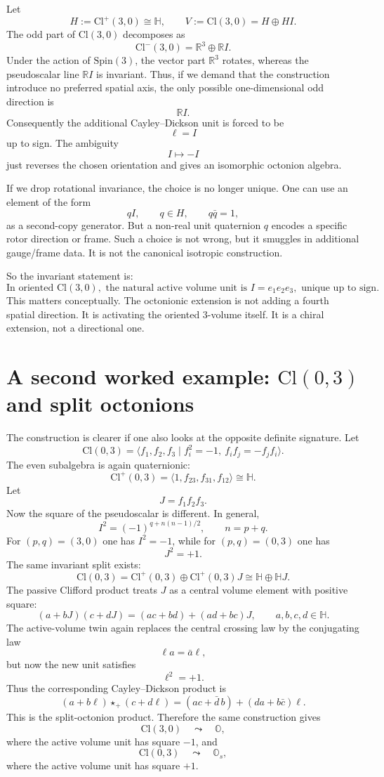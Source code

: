 \documentclass[11pt]{article}
\newcommand{\Cl}{\mathrm{Cl}}
\begin{document}
Let
\[
H:=\Cl^+(3,0)\cong \mathbb H,
\qquad
V:=\Cl(3,0)=H\oplus HI.
\]
The odd part of $\Cl(3,0)$ decomposes as
\[
\Cl^-(3,0)=\mathbb R^3\oplus \mathbb R I.
\]
Under the action of $\mathrm{Spin}(3)$, the vector part $\mathbb R^3$ rotates,
whereas the pseudoscalar line $\mathbb R I$ is invariant. Thus, if we demand
that the construction introduce no preferred spatial axis, the only possible
one-dimensional odd direction is
\[
\mathbb R I.
\]
Consequently the additional Cayley--Dickson unit is forced to be
\[
\ell=I
\]
up to sign. The ambiguity
\[
I\mapsto -I
\]
just reverses the chosen orientation and gives an isomorphic octonion algebra.

If we drop rotational invariance, the choice is no longer unique. One can use
an element of the form
\[
qI,
\qquad q\in H,
\qquad q\bar q=1,
\]
as a second-copy generator. But a non-real unit quaternion $q$ encodes a
specific rotor direction or frame. Such a choice is not wrong, but it smuggles
in additional gauge/frame data. It is not the canonical isotropic construction.

So the invariant statement is:
\[
\boxed{
\text{In oriented }\Cl(3,0),\text{ the natural active volume unit is }I=e_1e_2e_3,
\text{ unique up to sign.}
}
\]
This matters conceptually. The octonionic extension is not adding a fourth
spatial direction. It is activating the oriented $3$-volume itself. It is a
chiral extension, not a directional one.

\section{A second worked example: $\Cl(0,3)$ and split octonions}

The construction is clearer if one also looks at the opposite definite
signature. Let
\[
\Cl(0,3)=\langle f_1,f_2,f_3\mid f_i^2=-1,\ f_if_j=-f_jf_i\rangle.
\]
The even subalgebra is again quaternionic:
\[
\Cl^+(0,3)=\langle 1,f_{23},f_{31},f_{12}\rangle\cong \mathbb H.
\]
Let
\[
J=f_1f_2f_3.
\]
Now the square of the pseudoscalar is different. In general,
\[
I^2=(-1)^{q+n(n-1)/2},
\qquad n=p+q.
\]
For $(p,q)=(3,0)$ one has $I^2=-1$, while for $(p,q)=(0,3)$ one has
\[
J^2=+1.
\]
The same invariant split exists:
\[
\Cl(0,3)=\Cl^+(0,3)\oplus \Cl^+(0,3)J
        \cong \mathbb H\oplus\mathbb HJ.
\]
The passive Clifford product treats $J$ as a central volume element with
positive square:
\[
(a+bJ)(c+dJ)=(ac+bd)+(ad+bc)J,
\qquad a,b,c,d\in\mathbb H.
\]
The active-volume twin again replaces the central crossing law by the
conjugating law
\[
\ell a=\bar a\ell,
\]
but now the new unit satisfies
\[
\ell^2=+1.
\]
Thus the corresponding Cayley--Dickson product is
\[
(a+b\ell)\star_+(c+d\ell)
=
(ac+\bar d\,b)+(da+b\bar c)\ell.
\]
This is the split-octonion product. Therefore the same construction gives
\[
\Cl(3,0)\quad\leadsto\quad \mathbb O,
\]
where the active volume unit has square $-1$, and
\[
\Cl(0,3)\quad\leadsto\quad \mathbb O_s,
\]
where the active volume unit has square $+1$.
\end{document}
